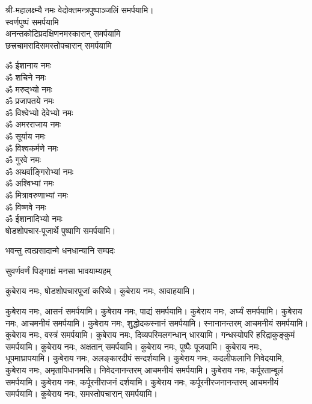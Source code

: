 \begin{center}
श्री-महालक्ष्म्यै नमः वेदोक्तमन्त्रपुष्पाञ्जलिं समर्पयामि।\\

स्वर्णपुष्पं समर्पयामि\\
 
अनन्तकोटिप्रदक्षिणनमस्कारान् समर्पयामि\\

छत्त्रचामरादिसमस्तोपचारान् समर्पयामि\\

\end{center}


ॐ ईशानाय नमः\\
ॐ शचिने नमः\\
ॐ मरुद्भ्यो नमः\\
ॐ प्रजापतये नमः\\
ॐ विश्वेभ्यो देवेभ्यो नमः\\
ॐ अमरराजाय नमः\\
ॐ सूर्याय नमः\\
ॐ विश्वकर्मणे नमः\\
ॐ गुरवे नमः\\
ॐ अथर्वाङ्गिरोभ्यां नमः\\
ॐ अश्विभ्यां नमः\\
ॐ मित्रावरुणाभ्यां नमः\\
ॐ विष्णवे नमः\\
ॐ ईशानादिभ्यो नमः\\

षोडशोपचार-पूजार्थे पुष्पाणि समर्पयामि।




{भवन्तु त्वत्प्रसादान्मे धनधान्यानि सम्पदः}

{सुवर्णवर्णं पिङ्गाक्षं मनसा भावयाम्यहम्}


कुबेराय नमः, षोडशोपचारपूजां करिष्ये।
कुबेराय नमः, आवाहयामि।


कुबेराय नमः, आसनं समर्पयामि।
कुबेराय नमः, पाद्यं समर्पयामि।
कुबेराय नमः, अर्घ्यं समर्पयामि।
कुबेराय नमः, आचमनीयं समर्पयामि।
कुबेराय नमः, शुद्धोदकस्नानं समर्पयामि। स्नानानन्तरम् आचमनीयं समर्पयामि।
कुबेराय नमः, वस्त्रं समर्पयामि।
कुबेराय नमः, दिव्यपरिमलगन्धान् धारयामि। गन्धस्योपरि हरिद्राकुङ्कुमं समर्पयामि।
कुबेराय नमः, अक्षतान् समर्पयामि।
कुबेराय नमः, पुष्पैः पूजयामि।
कुबेराय नमः, धूपमाघ्रापयामि।
कुबेराय नमः, अलङ्कारदीपं सन्दर्शयामि।
कुबेराय नमः, कदलीफलानि निवेदयामि, \\
कुबेराय नमः, अमृतापिधानमसि। निवेदनानन्तरम् आचमनीयं समर्पयामि।
कुबेराय नमः, कर्पूरताम्बूलं समर्पयामि।
कुबेराय नमः, कर्पूरनीराजनं दर्शयामि।
कुबेराय नमः, कर्पूरनीरजनानन्तरम् आचमनीयं समर्पयामि।
कुबेराय नमः, समस्तोपचारान् समर्पयामि।


